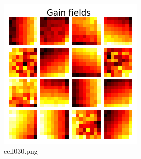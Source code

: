 \begin{figure}[ht]
	\centering
	\includegraphics[scale=0.8, max width=\linewidth]{./fig/solve-credit-assignment-problem/backpropagation/cell030.png}
	\caption{cell030.png}
	\label{cell030.png}
\end{figure}